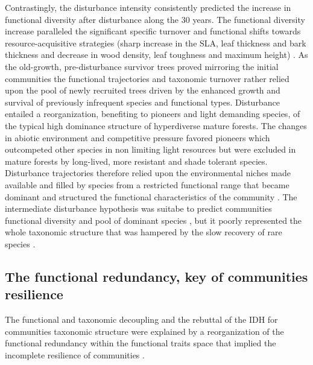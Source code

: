 \documentclass[fleqn,10pt]{ArtEcoFoG} %
\theoremstyle{definition}
\theoremstyle{definition}
\theoremstyle{definition}
\theoremstyle{remark}
\begin{document}
Contrastingly, the disturbance intensity consistently predicted the
increase in functional diversity after disturbance along the 30 years.
The functional diversity increase paralleled the significant specific
turnover and functional shifts towards resource-acquisitive strategies
(sharp increase in the SLA, leaf thickness and bark thickness and
decrease in wood density, leaf toughness and maximum height)
\citep{Westoby1998, Wright2004, Reich2014}. As the old-growth,
pre-disturbance survivor trees proved mirroring the initial communities
\citep{Herault2018} the functional trajectories and taxonomic turnover
rather relied upon the pool of newly recruited trees driven by the
enhanced growth and survival of previously infrequent species and
functional types. Disturbance entailed a reorganization, benefiting to
pioneers and light demanding species, of the typical high dominance
structure of hyperdiverse mature forests. The changes in abiotic
environment and competitive pressure favored pioneers which outcompeted
other species in non limiting light resources but were excluded in
mature forests by long-lived, more resistant and shade tolerant species.
Disturbance trajectories therefore relied upon the environmental niches
made available and filled by species from a restricted functional range
that became dominant and structured the functional characteristics of
the community \citep{Grime1998}. The intermediate disturbance hypothesis
was suitabe to predict communities functional diversity and pool of
dominant species \citep{Molino2001}, but it poorly represented the whole
taxonomic structure that was hampered by the slow recovery of rare
species \citep{Hubbell2001, Chave2004}.

\subsection{The functional redundancy, key of communities
resilience}\label{the-functional-redundancy-key-of-communities-resilience}

The functional and taxonomic decoupling and the rebuttal of the IDH for
communities taxonomic structure were explained by a reorganization of
the functional redundancy within the functional traits space that
implied the incomplete resilience of communities
\citep{Trenbath1999, Elmqvist2003, Diaz2005}.
\end{document}
